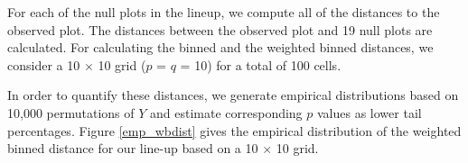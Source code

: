 \documentclass[12]{report}
\begin{document}
For each of the null plots in the lineup, we compute all of the distances to the observed plot.
The distances between the observed plot and 19 null plots are calculated. 
For calculating the binned and the weighted binned distances, we consider a 10 $\times$ 10 grid ($p$ = $q$ = 10) for a total of 100 cells. 

In order to  quantify  these distances, we generate empirical distributions based on 10,000 permutations of $Y$ and estimate corresponding $p$ values as lower tail percentages. 
 Figure \ref{emp_wbdist} gives  the empirical distribution of the weighted binned distance for our line-up based on a 10 $\times$ 10 grid. \\
\end{document}
